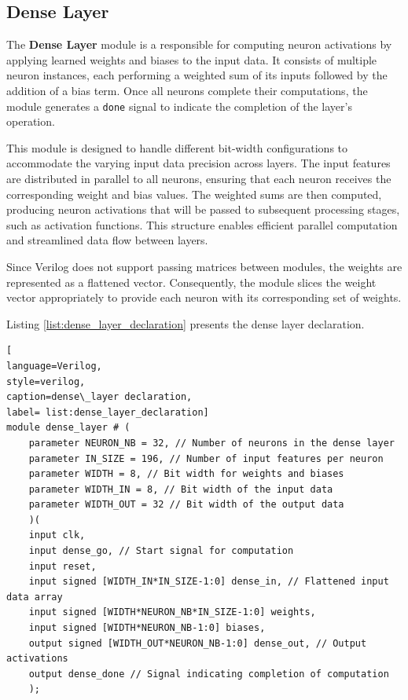 \documentclass[11pt]{report}
\begin{document}
\subsection{Dense Layer}

The \textbf{Dense Layer} module is a responsible for computing neuron activations by applying learned weights and biases to the input data. It consists of multiple neuron instances, each performing a weighted sum of its inputs followed by the addition of a bias term. Once all neurons complete their computations, the module generates a \texttt{done} signal to indicate the completion of the layer’s operation.  

This module is designed to handle different bit-width configurations to accommodate the varying input data precision across layers. The input features are distributed in parallel to all neurons, ensuring that each neuron receives the corresponding weight and bias values. The weighted sums are then computed, producing neuron activations that will be passed to subsequent processing stages, such as activation functions. This structure enables efficient parallel computation and streamlined data flow between layers.  

Since Verilog does not support passing matrices between modules, the weights are represented as a flattened vector. Consequently, the module slices the weight vector appropriately to provide each neuron with its corresponding set of weights. 

Listing \ref{list:dense_layer_declaration} presents the dense layer declaration.  

\begin{lstlisting}[
language=Verilog,
style=verilog,
caption=dense\_layer declaration,
label= list:dense_layer_declaration]
module dense_layer # (
    parameter NEURON_NB = 32, // Number of neurons in the dense layer
    parameter IN_SIZE = 196, // Number of input features per neuron
    parameter WIDTH = 8, // Bit width for weights and biases
    parameter WIDTH_IN = 8, // Bit width of the input data
    parameter WIDTH_OUT = 32 // Bit width of the output data
    )(
    input clk,
    input dense_go, // Start signal for computation
    input reset,
    input signed [WIDTH_IN*IN_SIZE-1:0] dense_in, // Flattened input data array
    input signed [WIDTH*NEURON_NB*IN_SIZE-1:0] weights,
    input signed [WIDTH*NEURON_NB-1:0] biases,
    output signed [WIDTH_OUT*NEURON_NB-1:0] dense_out, // Output activations
    output dense_done // Signal indicating completion of computation
    );     
\end{lstlisting}
\end{document}

